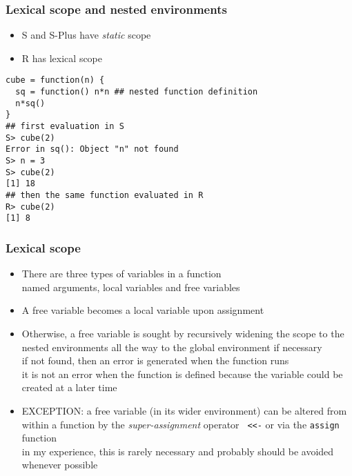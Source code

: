 \documentclass[11pt,pdftex,dvipsnames,usenames,helvetica]{beamer}
\begin{document}
\begin{frame}[fragile]
\frametitle{Lexical scope and nested environments}

\begin{itemize}
\item S and S-Plus have {\it static} scope
\item R has lexical scope
\end{itemize}

\begin{verbatim}
cube = function(n) {
  sq = function() n*n ## nested function definition
  n*sq()
}
## first evaluation in S
S> cube(2)
Error in sq(): Object "n" not found
S> n = 3
S> cube(2)
[1] 18
## then the same function evaluated in R
R> cube(2)
[1] 8
\end{verbatim}

\end{frame}

\begin{frame}[fragile]
\frametitle{Lexical scope}

\begin{itemize}
\item There are three types of variables in a function\\
named arguments, local variables and free variables
\item A free variable becomes a local variable upon assignment
\item Otherwise, a free variable is sought by recursively 
widening the scope to the nested environments all the way
to the global environment if necessary\\
if not found,
then an error is generated when the function runs\\
it is not an error when the function is defined
because the variable could be created at a later time
\item EXCEPTION: a free variable (in its wider environment) can be altered from within a function
  by the {\it super-assignment} operator {\tt
    <<-} or via the {\tt assign} function\\
in my experience, this is rarely necessary and probably should be avoided
whenever possible
\end{itemize}
\end{frame}
\end{document}
